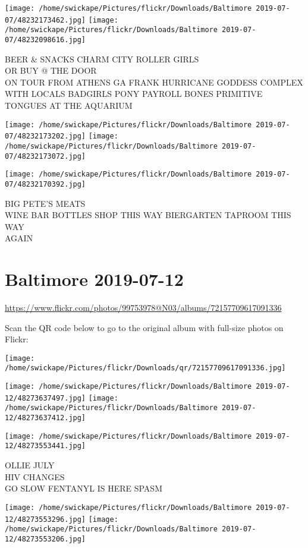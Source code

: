 \documentclass[10pt,letterpaper]{article}
\begin{document}
\vspace{0.25in}
\texttt{[image: /home/swickape/Pictures/flickr/Downloads/Baltimore 2019-07-07/48232173462.jpg]}
\texttt{[image: /home/swickape/Pictures/flickr/Downloads/Baltimore 2019-07-07/48232098616.jpg]}

BEER \& SNACKS CHARM CITY ROLLER GIRLS\\
OR BUY @ THE DOOR\\
ON TOUR FROM ATHENS GA FRANK HURRICANE GODDESS COMPLEX WITH LOCALS BADGIRLS PONY PAYROLL BONES PRIMITIVE TONGUES AT THE AQUARIUM
\pagebreak

\texttt{[image: /home/swickape/Pictures/flickr/Downloads/Baltimore 2019-07-07/48232173202.jpg]}
\texttt{[image: /home/swickape/Pictures/flickr/Downloads/Baltimore 2019-07-07/48232173072.jpg]}

\texttt{[image: /home/swickape/Pictures/flickr/Downloads/Baltimore 2019-07-07/48232170392.jpg]}

BIG PETE'S MEATS\\
WINE BAR BOTTLES SHOP THIS WAY BIERGARTEN TAPROOM THIS WAY\\
AGAIN
\pagebreak

\section*{Baltimore 2019-07-12}

\url{https://www.flickr.com/photos/99753978@N03/albums/72157709617091336}

Scan the QR code below to go to the original album with full-size photos on Flickr:

\texttt{[image: /home/swickape/Pictures/flickr/Downloads/qr/72157709617091336.jpg]}
\pagebreak

\texttt{[image: /home/swickape/Pictures/flickr/Downloads/Baltimore 2019-07-12/48273637497.jpg]}
\texttt{[image: /home/swickape/Pictures/flickr/Downloads/Baltimore 2019-07-12/48273637412.jpg]}

\vspace{0.25in}
\texttt{[image: /home/swickape/Pictures/flickr/Downloads/Baltimore 2019-07-12/48273553441.jpg]}

OLLIE JULY\\
HIV CHANGES\\
GO SLOW FENTANYL IS HERE SPASM
\pagebreak

\texttt{[image: /home/swickape/Pictures/flickr/Downloads/Baltimore 2019-07-12/48273553296.jpg]}
\texttt{[image: /home/swickape/Pictures/flickr/Downloads/Baltimore 2019-07-12/48273553206.jpg]}
\end{document}
